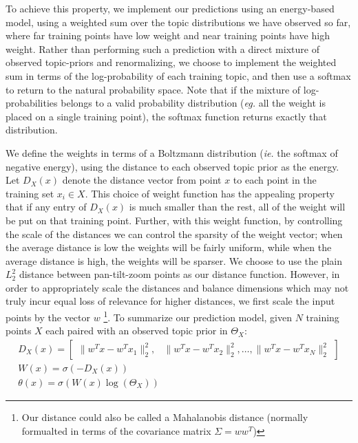 To achieve this property, we implement our predictions using an energy-based model, using a weighted sum over the topic distributions we have observed so far, where far training points have low weight and near training points have high weight. Rather than performing such a prediction with a direct mixture of observed topic-priors and renormalizing, we choose to implement the weighted sum in terms of the log-probability of each training topic, and then use a softmax to return to the natural probability space. Note that if the mixture of log-probabilities belongs to a valid probability distribution (\emph{eg.} all the weight is placed on a single training point), the softmax function returns exactly that distribution.

We define the weights in terms of a Boltzmann distribution (\emph{ie.} the softmax of negative energy), using the distance to each observed topic prior as the energy. Let $D_X(x)$ denote the distance vector from point $x$ to each point in the training set $x_i \in X$. This choice of weight function has the appealing property that if any entry of $D_X(x)$ is much smaller than the rest, all of the weight will be put on that training point. Further, with this weight function, by controlling the scale of the distances we can control the sparsity of the weight vector; when the average distance is low the weights will be fairly uniform, while when the average distance is high, the weights will be sparser. We choose to use the plain $\mathit{L}_2^2$ distance between pan-tilt-zoom points as our distance function. However, in order to appropriately scale the distances and balance dimensions which may not truly incur equal loss of relevance for higher distances, we first scale the input points by the vector $w$ \footnote{Our distance could also be called a Mahalanobis distance (normally formualted in terms of the covariance matrix $\Sigma = ww^T$)}. To summarize our prediction model, given $N$ training points $X$ each paired with an observed topic prior in $\Theta_X$:
\begin{equation}
\begin{split}
    D_X(x) = 
    \begin{bmatrix}
    \|w^Tx - w^T x_1 \|_2^2, & \|w^Tx - w^T x_2 \|_2^2, \ldots, \|w^Tx - w^T x_N \|_2^2
    \end{bmatrix}\\
    W(x) = \sigma \left( -D_{X}(x) \right)\\
    \theta(x) = \sigma \left( W(x) \log \left(\Theta_X \right) \right)
\end{split}
\end{equation}


